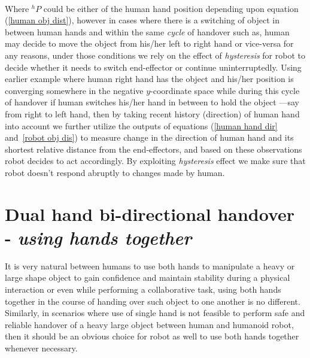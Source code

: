 \documentclass[a4paper, 12pt, oneside]{Thesis}  %
\begin{document}
\paragraph*{}
Where ${}^{h}{P}$ could be either of the human hand position depending upon equation (\ref{human obj dist}), however in cases where there is a switching of object in between human hands and within the same \textit{cycle} of handover such as, human may decide to move the object from his/her left to right hand or vice-versa for any reasons, under those conditions we rely on the effect of \textit{hysteresis} for robot to decide whether it needs to switch end-effector or continue uninterruptedly. Using earlier example where human right hand has the object and his/her position is converging somewhere in the negative $y$-coordinate space while during this cycle of handover if human switches his/her hand in between to hold the object ---say from right to left hand, then by taking recent history (direction) of human hand into account we further utilize the outputs of equations (\ref{human hand dir} and~\ref{robot obj dis}) to measure change in the direction of human hand and its shortest relative distance from the end-effectors, and based on these observations robot decides to act accordingly. By exploiting \textit{hysteresis} effect we make sure that robot doesn't respond abruptly to changes made by human.



\clearpage

\section{Dual hand bi-directional handover - \textit{using hands together}}\label{both hands together}

It is very natural between humans to use both hands to manipulate a heavy or large shape object to gain confidence and maintain stability during a physical interaction or even while performing a collaborative task, using both hands together in the course of handing over such object to one another is no different. Similarly, in scenarios where use of single hand is not feasible to perform safe and reliable handover of a heavy large object between human and humanoid robot, then it should be an obvious choice for robot as well to use both hands together whenever necessary. 
\end{document}
